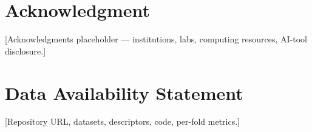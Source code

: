 \documentclass[conference]{IEEEtran}
\newif\ifdraftmode
\newcommand{\draftnote}[1]{%
  \ifdraftmode
    \par\noindent
    \colorbox{yellow!30}{\parbox{\dimexpr\columnwidth-2\fboxsep}{%
      \small\sffamily\textcolor{black!70}{#1}}}%
    \par\smallskip
  \fi
}
\begin{document}
\draftnote{%
\textbf{Summarize only confirmed findings:}\\
\textbullet\ Predictive information retained in X10.\\
\textbullet\ Chemically interpretable ablation results.\\
\textbullet\ Matched quantum–classical comparison outcome.\\
\textbullet\ Kernel-alignment finding.\\
\textbullet\ Historical-holdout behavior.\\
\textbullet\ Applicability-domain deterioration pattern.\\
\textbullet\ Regional transfer result.\\[4pt]
Do \emph{not} introduce new results, citations, or claims.}

\section*{Acknowledgment}
\label{sec:acknowledgment}

\textcolor{red!60!black}{[Acknowledgments placeholder — institutions,
labs, computing resources, AI-tool disclosure.]}

\section*{Data Availability Statement}

\textcolor{red!60!black}{[Repository URL, datasets, descriptors,
code, per-fold metrics.]}

%
%
% 
% 
%
\end{document}
